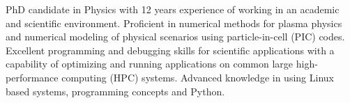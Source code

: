 
PhD candidate in Physics with 12 years experience of working in an academic
and scientific environment. Proficient in numerical methods for plasma
physics and numerical modeling of physical scenarios using particle-in-cell
(PIC) codes. Excellent programming and debugging skills for scientific
applications with a capability of optimizing and running applications on
common large high-performance computing (HPC) systems. Advanced knowledge
in using Linux based systems, programming concepts and Python.
